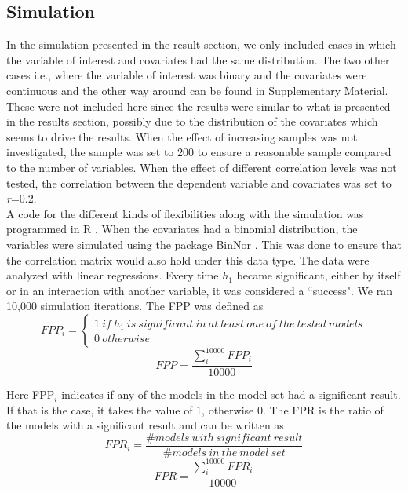 \subsection{Simulation}
In the simulation presented in the result section, we only included cases in which the variable of interest and covariates had the same distribution. The two other cases i.e., where the variable of interest was binary and the covariates were continuous and the other way around can be found in Supplementary Material. These were not included here since the results were similar to what is presented in the results section, possibly due to the distribution of the covariates which seems to drive the results. When the effect of increasing samples was not investigated, the sample was set to 200 to ensure a reasonable sample compared to the number of variables. When the effect of different correlation levels was not tested, the correlation between the dependent variable and covariates was set to \textit{r}=0.2.\\
A code for the different kinds of flexibilities along with the simulation was programmed in R \citep{Team2018}. When the covariates had a binomial distribution, the variables were simulated using the package BinNor \citep{Demirtas2014}. This was done to ensure that the correlation matrix would also hold under this data type. The data were analyzed with linear regressions. Every time $h_1$ became significant, either by itself or in an interaction with another variable, it was considered a “success". We ran  10,000 simulation iterations. The FPP was defined as \\

\[FPP_i=\left. \left\{\begin{array}{c}
1\ if\ h_1\ is\ significant\ in\ at\ least\ one \ of\ the\ tested\ models \\ 
0\ otherwise\  \end{array}
\right.\] 
\[FPP=\frac{\sum^{10000}_i{FPP_i}}{10000}\] 


Here FPP${}_{i}$ indicates if any of the models in the model set had a significant result. If that is the case, it takes the value of 1, otherwise 0. The FPR is the ratio of the models with a significant result and can be written as \\

\[FPR_i=\frac{\#models\ with\ significant\ result}{\#models\ in\ the\ model\ set}\] 
\[FPR=\frac{\sum^{10000}_i{FPR_i}}{10000}\] 



